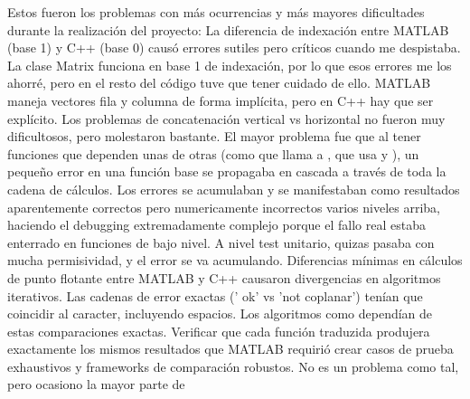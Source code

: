 \markdownRendererDocumentBegin
\markdownRendererSectionBegin
{}\markdownRendererInterblockSeparator
{}Estos fueron los problemas con más ocurrencias y más mayores dificultades durante la realización del proyecto:\markdownRendererInterblockSeparator
{}\markdownRendererSectionBegin
{}\markdownRendererInterblockSeparator
{}La diferencia de indexación entre MATLAB (base 1) y C++ (base 0) causó errores sutiles pero críticos cuando me despistaba. La clase Matrix funciona en base 1 de indexación, por lo que esos errores me los ahorré, pero en el resto del código tuve que tener cuidado de ello.\markdownRendererInterblockSeparator
{}
\markdownRendererSectionEnd \markdownRendererSectionBegin
{}\markdownRendererInterblockSeparator
{}MATLAB maneja vectores fila y columna de forma implícita, pero en C++ hay que ser explícito. Los problemas de concatenación vertical vs horizontal no fueron muy dificultosos, pero molestaron bastante.\markdownRendererInterblockSeparator
{}
\markdownRendererSectionEnd \markdownRendererSectionBegin
{}\markdownRendererInterblockSeparator
{}El mayor problema fue que al tener funciones que dependen unas de otras (como  que llama a , que usa  y ), un pequeño error en una función base se propagaba en cascada a través de toda la cadena de cálculos. Los errores se acumulaban y se manifestaban como resultados aparentemente correctos pero numericamente incorrectos varios niveles arriba, haciendo el debugging extremadamente complejo porque el fallo real estaba enterrado en funciones de bajo nivel. A nivel test unitario, quizas pasaba con mucha permisividad, y el error se va acumulando.\markdownRendererInterblockSeparator
{}
\markdownRendererSectionEnd \markdownRendererSectionBegin
{}\markdownRendererInterblockSeparator
{}Diferencias mínimas en cálculos de punto flotante entre MATLAB y C++ causaron divergencias en algoritmos iterativos.\markdownRendererInterblockSeparator
{}
\markdownRendererSectionEnd \markdownRendererSectionBegin
{}\markdownRendererInterblockSeparator
{}Las cadenas de error exactas (' ok' vs 'not coplanar') tenían que coincidir al caracter, incluyendo espacios. Los algoritmos como  dependían de estas comparaciones exactas.\markdownRendererInterblockSeparator
{}
\markdownRendererSectionEnd \markdownRendererSectionBegin
{}\markdownRendererInterblockSeparator
{}Verificar que cada función traduzida produjera exactamente los mismos resultados que MATLAB requirió crear casos de prueba exhaustivos y frameworks de comparación robustos. No es un problema como tal, pero ocasiono la mayor parte de
\markdownRendererSectionEnd 
\markdownRendererSectionEnd \markdownRendererDocumentEnd